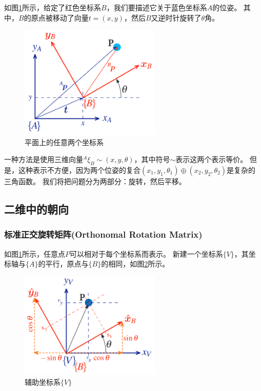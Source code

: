 \documentclass[UTF8,a4paper,10pt]{ctexart}
\begin{document}
如图\ref{fig:two_frame_2D}所示，给定了红色坐标系${B}$，我们要描述它关于蓝色坐标系${A}$的位姿。
其中，${B}$的原点被移动了向量$t=(x,y)$，然后${B}$又逆时针旋转了$\theta$角。
\begin{figure}[htbp]
  \centerline{\includegraphics[width=0.6\textwidth]{two_frame_2D}}
  \caption{平面上的任意两个坐标系}
  \label{fig:two_frame_2D}
\end{figure}
一种方法是使用三维向量${}^A\xi_B\sim(x,y,\theta)$，其中符号$\sim$表示这两个表示等价。
但是，这种表示不方便，因为两个位姿的复合$(x_1,y_1,\theta_1)\oplus(x_2,y_2,\theta_2)$是复杂的三角函数。
我们将把问题分为两部分：旋转，然后平移。

\subsection{二维中的朝向}
\subsubsection{标准正交旋转矩阵(Orthonomal Rotation Matrix)}

如图\ref{fig:two_frame_2D}所示，任意点$P$可以相对于每个坐标系而表示。
新建一个坐标系$\{V\}$，其坐标轴与$\{A\}$的平行，原点与$\{B\}$的相同，如图\ref{fig:two_frame_2D_V}所示。
\begin{figure}[htbp]
  \centerline{\includegraphics[width=0.6\textwidth]{two_frame_2D_V}}
  \caption{辅助坐标系$\{V\}$}
  \label{fig:two_frame_2D_V}
\end{figure}
\end{document}
